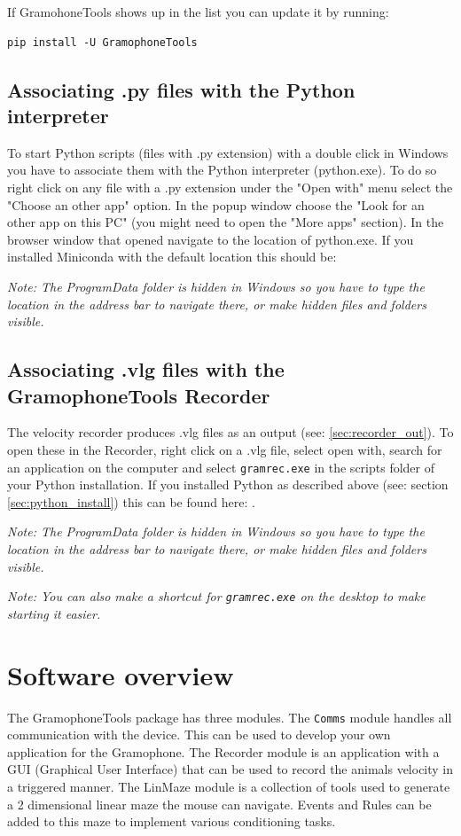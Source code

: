 \documentclass[11pt,a4paper]{article}
\newcommand{\note}[1]{\textit{Note: {#1}}}
\begin{document}
If GramohoneTools shows up in the list you can update it by running:
\begin{verbatim}
pip install -U GramophoneTools
\end{verbatim}

\subsection{Associating .py files with the Python interpreter}
To start Python scripts (files with .py extension) with a double click in Windows you have to associate them with the Python interpreter (python.exe). To do so right click on any file with a .py extension under the "Open with" menu select the "Choose an other app" option. In the popup window choose the "Look for an other app on this PC" (you might need to open the "More apps" section). In the browser window that opened navigate to the location of python.exe. If you installed Miniconda with the default location this should be: 

\note{The ProgramData folder is hidden in Windows so you have to type the location in the address bar to navigate there, or make hidden files and folders visible.}

\subsection{Associating .vlg files with the GramophoneTools Recorder}
The velocity recorder produces .vlg files as an output (see: \ref{sec:recorder_out}). To open these in the Recorder, right click on a .vlg file, select open with, search for an application on the computer and select \texttt{gramrec.exe} in the scripts folder of your Python installation. If you installed Python as described above (see: section \ref{sec:python_install}) this can be found here: .

\note{The ProgramData folder is hidden in Windows so you have to type the location in the address bar to navigate there, or make hidden files and folders visible.}

\note{You can also make a shortcut for \texttt{gramrec.exe} on the desktop to make starting it easier.}

\section{Software overview}
The GramophoneTools package has three modules. The \texttt{Comms} module handles all communication with the device. This can be used to develop your own application for the Gramophone. The Recorder module is an application with a GUI (Graphical User Interface) that can be used to record the animals velocity in a triggered manner. The LinMaze module is a collection of tools used to generate a 2 dimensional linear maze the mouse can navigate. Events and Rules can be added to this maze to implement various conditioning tasks.
\end{document}
